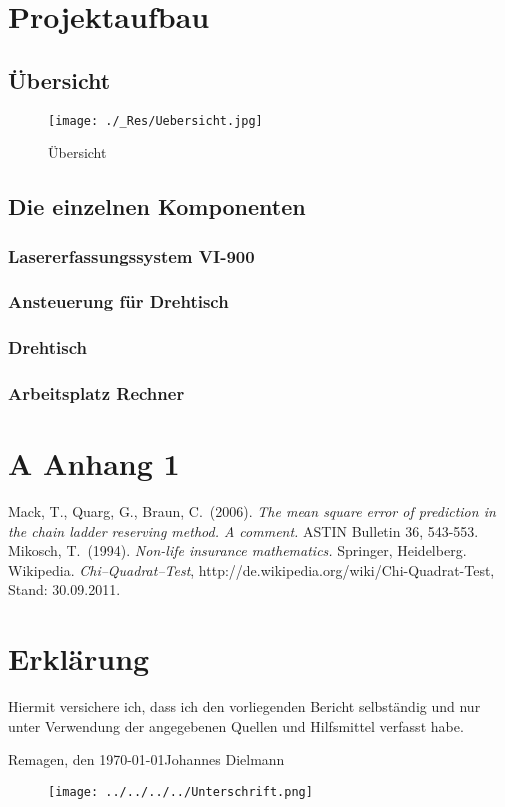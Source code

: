 \documentclass[11pt]{article}
\begin{document}
\section{Projektaufbau}
\subsection{Übersicht}
\begin{figure}[hp]
	\centering
	\texttt{[image: ./\_Res/Uebersicht.jpg]}
	\caption{Übersicht}
\end{figure}
\subsection{Die einzelnen Komponenten}
\subsubsection{Lasererfassungssystem VI-900}
\subsubsection{Ansteuerung für Drehtisch}
\subsubsection{Drehtisch}
\subsubsection{Arbeitsplatz Rechner}
\newpage

\section*{A Anhang 1}
\newpage

\begin{thebibliography}{99}
 Mack, T., Quarg, G., Braun, C.\ (2006). {\em The mean square error of prediction in the chain ladder reserving method. A comment.} ASTIN Bulletin 36, 543-553. 
 Mikosch, T.\ (1994). {\em Non-life insurance mathematics.} Springer, Heidelberg.
 Wikipedia. {\em Chi--Quadrat--Test}, http://de.wikipedia.org/wiki/Chi-Quadrat-Test, Stand: 30.09.2011.
\end{thebibliography}
\newpage

\section*{Erklärung}

\vspace{2cm}

Hiermit versichere ich, dass ich den vorliegenden Bericht selbständig und nur unter Verwendung der angegebenen Quellen und Hilfsmittel verfasst habe.

\vspace{2cm}

Remagen, den \today \hfill {Johannes Dielmann} 
\begin{figure}[hp]
	\hfill
	\texttt{[image: ../../../../Unterschrift.png]}
\end{figure}
\end{document}
